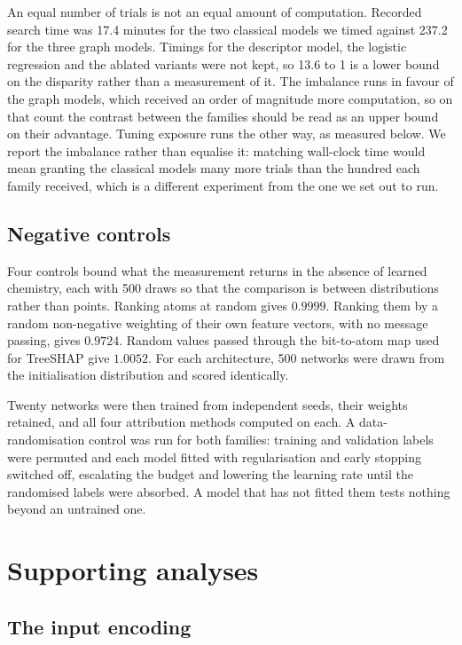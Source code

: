 \documentclass[journal=jcisd8,manuscript=suppinfo]{achemso}
\begin{document}
An equal number of trials is not an equal amount of computation. Recorded search time was 17.4 minutes for the two classical models we timed against 237.2 for
the three graph models. Timings for the descriptor model, the logistic regression and the
ablated variants were not kept, so 13.6 to 1 is a lower bound on the disparity rather than a
measurement of it. The imbalance runs in favour of the graph
models, which received an order of magnitude more computation, so on that count the contrast
between the families should be read as an upper bound on their advantage. Tuning exposure
runs the other way, as measured below. We report the imbalance rather than
equalise it: matching wall-clock time would mean granting the classical models many more
trials than the hundred each family received, which is a different experiment from the one
we set out to run.

\subsection{Negative controls}

Four controls bound what the measurement returns in the absence of learned chemistry, each
with 500 draws so that the comparison is between distributions rather than points. Ranking
atoms at random gives $0.9999$. Ranking them by a random non-negative weighting of their own
feature vectors, with no message passing, gives $0.9724$. Random values passed through the
bit-to-atom map used for TreeSHAP give $1.0052$. For each architecture, 500 networks were
drawn from the initialisation distribution and scored identically.

Twenty networks were then trained from independent seeds, their weights retained, and all
four attribution methods computed on each. A data-randomisation control was run for both
families: training and validation labels were permuted and each model fitted with
regularisation and early stopping switched off, escalating the budget and lowering the
learning rate until the randomised labels were absorbed. A model that has not fitted them
tests nothing beyond an untrained one.

\section{Supporting analyses}

\subsection{The input encoding}
\end{document}

